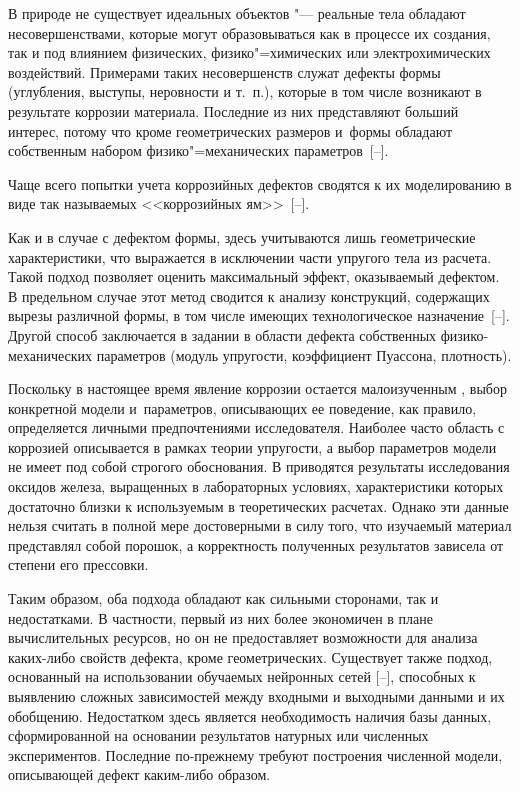 \makerutitle






В природе не существует идеальных объектов "--- реальные тела обладают несовершенствами, которые могут образовываться как в процессе их создания, так и под влиянием физических, физико"=химических или электрохимических воздействий. Примерами таких несовершенств служат дефекты формы (углубления, выступы, неровности и т.~п.), которые в том числе возникают в результате коррозии материала. Последние из них представляют больший интерес, потому что кроме геометрических размеров и~формы обладают собственным набором физико"=механических параметров~\mbox{[--].}



Чаще всего попытки учета коррозийных дефектов сводятся к их моделированию в виде так называемых <<коррозийных ям>>~[--]. 

Как и в случае с дефектом формы, здесь учитываются лишь геометрические характеристики, что выражается в исключении части упругого тела из расчета. Такой подход позволяет оценить максимальный эффект, оказываемый дефектом. В предельном случае этот метод сводится к анализу конструкций, содержащих вырезы различной формы, в том числе имеющих технологическое назначение~[--]. Другой способ заключается в задании в области дефекта собственных физико-механических параметров (модуль упругости, коэффициент Пуассона, плотность). 

Поскольку в настоящее время явление коррозии остается малоизученным \cite{04_Ouglova}, выбор конкретной модели и~параметров, описывающих ее поведение, как правило, определяется личными предпочтениями исследователя. Наиболее часто область с коррозией описывается в рамках теории упругости, а выбор параметров модели не имеет под собой строгого обоснования. В \cite{04_Ouglova} приводятся результаты исследования оксидов железа, выращенных в лабораторных условиях, характеристики которых достаточно близки к используемым в теоретических расчетах. Однако эти данные нельзя считать в полной мере достоверными в силу того, что изучаемый материал представлял собой порошок, а корректность полученных результатов зависела от степени его прессовки. 

Таким образом, оба подхода обладают как сильными сторонами, так и недостатками. В частности, первый из них более экономичен в плане вычислительных ресурсов, но он не предоставляет возможности для анализа каких-либо свойств дефекта, кроме геометрических. Существует также подход, основанный на использовании обучаемых нейронных сетей [--], способных к выявлению сложных зависимостей между входными и выходными данными и их обобщению. Недостатком здесь является необходимость наличия базы данных, сформированной на основании результатов натурных или численных экспериментов. Последние по-прежнему требуют построения численной модели, описывающей дефект каким-либо образом.




